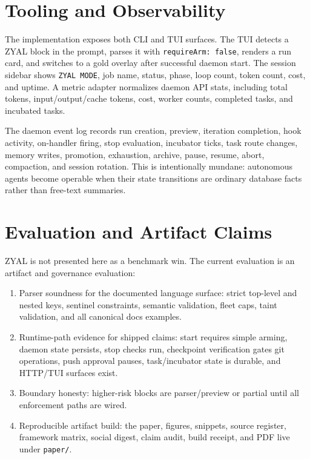 \documentclass[conference]{IEEEtran}
\newcommand{\ZYAL}{ZYAL}
\begin{document}
\section{Tooling and Observability}

The implementation exposes both CLI and TUI surfaces. The TUI detects a \ZYAL{} block in the prompt, parses it with \texttt{requireArm: false}, renders a run card, and switches to a gold overlay after successful daemon start. The session sidebar shows \texttt{ZYAL MODE}, job name, status, phase, loop count, token count, cost, and uptime. A metric adapter normalizes daemon API stats, including total tokens, input/output/cache tokens, cost, worker counts, completed tasks, and incubated tasks.

The daemon event log records run creation, preview, iteration completion, hook activity, on-handler firing, stop evaluation, incubator ticks, task route changes, memory writes, promotion, exhaustion, archive, pause, resume, abort, compaction, and session rotation. This is intentionally mundane: autonomous agents become operable when their state transitions are ordinary database facts rather than free-text summaries.

\section{Evaluation and Artifact Claims}

\ZYAL{} is not presented here as a benchmark win. The current evaluation is an artifact and governance evaluation:

\begin{enumerate}
  \item Parser soundness for the documented language surface: strict top-level and nested keys, sentinel constraints, semantic validation, fleet caps, taint validation, and all canonical docs examples.
  \item Runtime-path evidence for shipped claims: start requires simple arming, daemon state persists, stop checks run, checkpoint verification gates git operations, push approval pauses, task/incubator state is durable, and HTTP/TUI surfaces exist.
  \item Boundary honesty: higher-risk blocks are parser/preview or partial until all enforcement paths are wired.
  \item Reproducible artifact build: the paper, figures, snippets, source register, framework matrix, social digest, claim audit, build receipt, and PDF live under \texttt{paper/}.
\end{enumerate}
\end{document}
